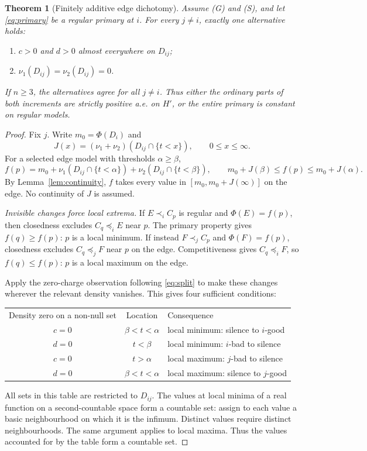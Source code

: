 \documentclass[11pt]{article}
\newtheorem{theorem}{Theorem}
\theoremstyle{remark}\newtheorem{remark}[theorem]{Remark}
\begin{document}
\begin{theorem}[Finitely additive edge dichotomy]\label{thm:dichotomy}
Assume (G) and (S), and let \eqref{eq:primary} be a regular primary at $i$.
For every $j\ne i$, exactly one alternative holds:
\begin{enumerate}[label=(\alph*),leftmargin=*]
\item $c>0$ and $d>0$ almost everywhere on $D_{ij}$;
\item $\nu_1(D_{ij})=\nu_2(D_{ij})=0$.
\end{enumerate}
If $n\ge3$, the alternatives agree for all $j\ne i$. Thus either the
ordinary parts of both increments are strictly positive a.e. on $H'$, or
the entire primary is constant on regular models.
\end{theorem}
\begin{proof}
Fix $j$. Write $m_0=\Phi(D_i)$ and
\[
 J(x)=(\nu_1+\nu_2)(D_{ij}\cap\{t<x\}),\qquad 0\le x\le\infty.
\]
For a selected edge model with thresholds $\alpha\ge\beta$,
\begin{equation}
 f(p)=m_0+\nu_1(D_{ij}\cap\{t<\alpha\})
             +\nu_2(D_{ij}\cap\{t<\beta\}),\qquad
 m_0+J(\beta)\le f(p)\le m_0+J(\alpha).
 \label{eq:bounds}
\end{equation}
By Lemma~\ref{lem:continuity}, $f$ takes every value in
$[m_0,m_0+J(\infty)]$ on the edge. No continuity of $J$ is assumed.

\emph{Invisible changes force local extrema.}
If $E\prec_i C_p$ is regular and $\Phi(E)=f(p)$, then closedness excludes
$C_q\preceq_i E$ near $p$. The primary property gives $f(q)\ge f(p)$:
$p$ is a local minimum. If instead $F\prec_j C_p$ and $\Phi(F)=f(p)$,
closedness excludes $C_q\preceq_j F$ near $p$ on the edge.
Competitiveness gives $C_q\preceq_i F$, so $f(q)\le f(p)$:
$p$ is a local maximum on the edge.

Apply the zero-charge observation following \eqref{eq:split} to make these
changes wherever the relevant density vanishes. This gives four sufficient
conditions:
\begin{center}
\begin{tabular}{ccl}
Density zero on a non-null set & Location & Consequence\\[2pt]
$c=0$ & $\beta<t<\alpha$ & local minimum: silence to $i$-good\\
$d=0$ & $t<\beta$ & local minimum: $i$-bad to silence\\
$c=0$ & $t>\alpha$ & local maximum: $j$-bad to silence\\
$d=0$ & $\beta<t<\alpha$ & local maximum: silence to $j$-good
\end{tabular}
\end{center}
All sets in this table are restricted to $D_{ij}$.
The values at local minima of a real function on a second-countable space
form a countable set: assign to each value a basic neighbourhood on which
it is the infimum. Distinct values require distinct neighbourhoods.
The same argument applies to local maxima. Thus the values accounted for
by the table form a countable set.


\end{proof}
\end{document}
